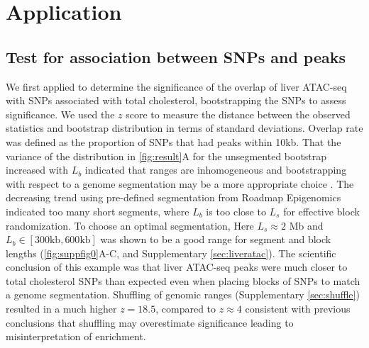 \vspace*{-.5cm}
\section{Application}
\subsection{Test for association between SNPs and peaks}

We first applied \bootranges to determine the significance of the
overlap of liver ATAC-seq
\citep{CURRIN20211169} with SNPs associated with total cholesterol,
bootstrapping the SNPs to assess significance.
We used the $z$ score to measure the distance between the observed
statistics and bootstrap distribution in terms of standard deviations.
Overlap rate was defined as the proportion of
SNPs that had peaks within 10kb.
That the variance of the distribution in \cref{fig:result}A for the
unsegmented bootstrap increased with $L_b$ indicated that
ranges are inhomogeneous and
bootstrapping with respect to a genome
segmentation may be a more appropriate choice
\citep{bickel2010subsampling}. 
The decreasing trend using pre-defined segmentation from
Roadmap Epigenomics indicated too many short segments,
where $L_b$ is too close to $L_s$ for effective block randomization.
To choose an optimal segmentation, 
Here $L_s \approx 2$ Mb and $L_b \in [300\textrm{kb},600\textrm{kb}]$ was 
shown to be a good range for segment and block
lengths (\cref{fig:suppfig0}A-C, and Supplementary \cref{sec:liveratac}).
The scientific conclusion of this example was that liver ATAC-seq
peaks were
much closer to total cholesterol SNPs than expected even when placing
blocks of SNPs to match a genome segmentation. 
Shuffling of genomic ranges (Supplementary \cref{sec:shuffle})
resulted in a much higher $z = 18.5$, compared to $z \approx 4$ 
consistent with previous conclusions that shuffling may 
overestimate significance leading to misinterpretation of enrichment.


